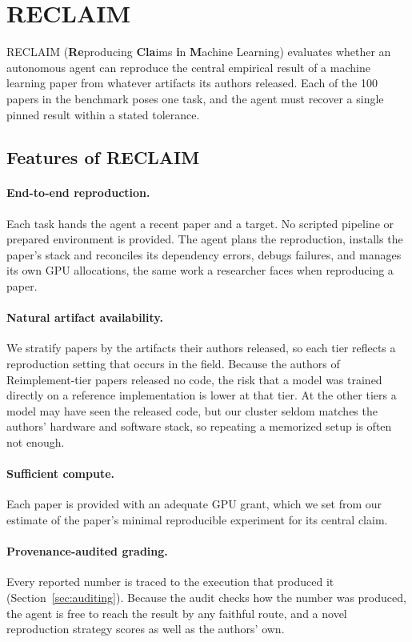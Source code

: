 \documentclass{article} %
\begin{document}
\section{RECLAIM}
\label{sec:reclaim}

RECLAIM (\textbf{Re}producing \textbf{Cla}ims \textbf{i}n \textbf{M}achine Learning) evaluates whether an
autonomous agent can reproduce the central
empirical result of a machine learning paper from whatever artifacts its
authors released. Each of the 100 papers in the benchmark poses one
task, and the agent must recover a single pinned result within a stated
tolerance.
\subsection{Features of RECLAIM}
\label{subsec:features}

\paragraph{End-to-end reproduction.} Each task hands the agent a recent
paper and a target. No scripted pipeline or prepared environment is
provided. The agent plans the reproduction, installs the paper's stack and
reconciles its dependency errors, debugs failures, and manages its own GPU
allocations, the same work a researcher faces when reproducing a paper.

\paragraph{Natural artifact availability.} We stratify papers by the artifacts
their authors released, so each tier reflects a reproduction setting that
occurs in the field. Because the authors of Reimplement-tier papers released
no code, the risk that a model was trained directly on a reference
implementation is lower at that tier. At the other tiers a model may have seen
the released code, but our cluster seldom matches the authors' hardware and
software stack, so repeating a memorized setup is often not enough.

\paragraph{Sufficient compute.} Each paper is provided with an adequate GPU
grant, which we set from our estimate of the paper's minimal reproducible
experiment for its central claim.

\paragraph{Provenance-audited grading.} Every reported number is traced to
the execution that produced it (Section~\ref{sec:auditing}). Because the
audit checks how the number was produced, the agent is free to reach the
result by any faithful route, and a novel reproduction strategy scores as
well as the authors' own.
\end{document}
